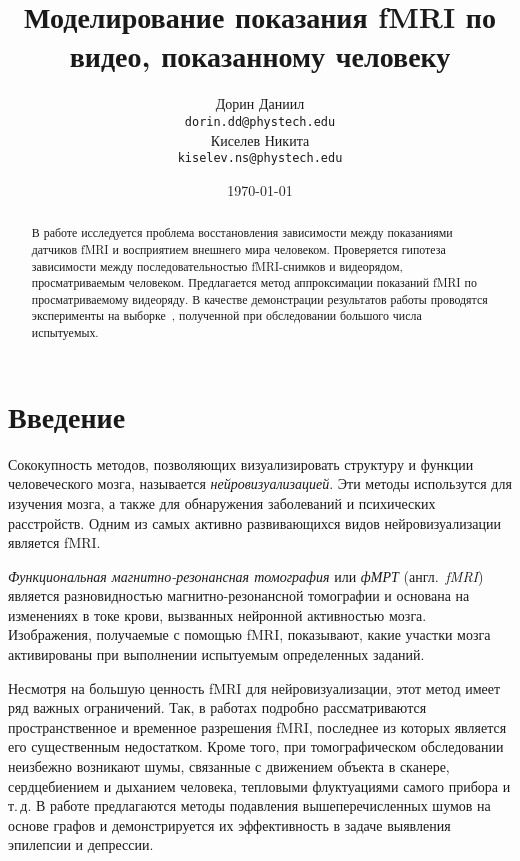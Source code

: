 \documentclass[a4paper, 12pt]{article}
\title{Моделирование показания fMRI по видео, показанному человеку}
\author{
	Дорин Даниил \\
	\texttt{dorin.dd@phystech.edu} \\
	\And
	Киселев Никита \\
	\texttt{kiselev.ns@phystech.edu} \\
}
\date{\today}
\begin{document}
\maketitle

\begin{abstract}
	
	В работе исследуется проблема восстановления зависимости между показаниями датчиков fMRI
	и восприятием внешнего мира человеком.
	Проверяется гипотеза зависимости между последовательностью fMRI-снимков и видеорядом,
	просматриваемым человеком. 
	Предлагается метод аппроксимации показаний fMRI по просматриваемому видеоряду.
	В качестве демонстрации результатов работы проводятся эксперименты на 
	выборке~\citep{Berezutskaya2022}, полученной при обследовании большого числа испытуемых.

\end{abstract}



\section{Введение}

	Сококупность методов, позволяющих визуализировать структуру и функции человеческого мозга,
	называется \textit{нейровизуализацией}. Эти методы использутся для изучения мозга, а также
	для обнаружения заболеваний и психических расстройств. Одним из самых активно развивающихся
	видов нейровизуализации является fMRI.
	
	\textit{Функциональная магнитно-резонансная томография} или \textit{фМРТ} (англ.~\textit{fMRI}) 
	является разновидностью магнитно-резонансной томографии и основана на изменениях в токе крови, 
	вызванных нейронной активностью мозга. Изображения, получаемые с помощью fMRI, показывают,
	какие участки мозга активированы при выполнении испытуемым определенных заданий.

	Несмотря на большую ценность fMRI для нейровизуализации, этот метод имеет ряд важных ограничений.
	Так, в работах \citep{menon1999spatial, logothetis2008we} подробно рассматриваются 
	пространственное и временное разрешения fMRI, последнее из которых является его существенным
	недостатком. Кроме того, при томографическом обследовании неизбежно возникают шумы, 
	связанные с движением объекта в сканере, сердцебиением и дыханием человека, тепловыми
	флуктуациями самого прибора и т.\,д. В работе \citep{1804.10167} предлагаются методы 
	подавления вышеперечисленных шумов на основе графов и демонстрируется их эффективность в задаче
	выявления эпилепсии и депрессии.
\end{document}
